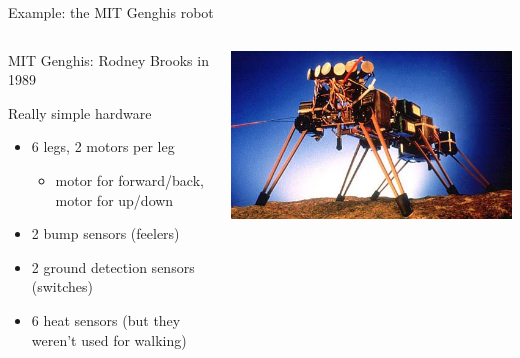 \documentclass[compress]{beamer}
\begin{document}

\begin{frame}{Example: the MIT Genghis robot}


    \begin{columns}
        \begin{column}{0.5\linewidth}

            MIT Genghis: Rodney Brooks in 1989

            Really simple hardware


            \begin{itemize}

                \item 6 legs, 2 motors per leg
                    \begin{itemize}
                        \item motor for forward/back, motor for up/down
                    \end{itemize}
                \item 2 bump sensors (feelers)
                \item 2 ground detection sensors (switches)
                \item 6 heat sensors (but they weren’t used for walking)
            \end{itemize}
        \end{column}
        \begin{column}{0.5\linewidth}

            \begin{center}
                \includegraphics[width=\linewidth]{genghis}
            \end{center}
        \end{column}
    \end{columns}
\end{frame}
\end{document}
